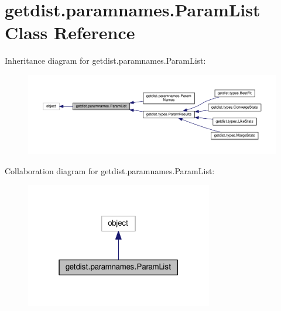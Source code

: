 \hypertarget{classgetdist_1_1paramnames_1_1ParamList}{}\section{getdist.\+paramnames.\+Param\+List Class Reference}
\label{classgetdist_1_1paramnames_1_1ParamList}


Inheritance diagram for getdist.\+paramnames.\+Param\+List\+:
\nopagebreak
\begin{figure}[H]
\begin{center}
\leavevmode
\includegraphics[width=350pt]{classgetdist_1_1paramnames_1_1ParamList__inherit__graph}
\end{center}
\end{figure}


Collaboration diagram for getdist.\+paramnames.\+Param\+List\+:
\nopagebreak
\begin{figure}[H]
\begin{center}
\leavevmode
\includegraphics[width=232pt]{classgetdist_1_1paramnames_1_1ParamList__coll__graph}
\end{center}
\end{figure}

